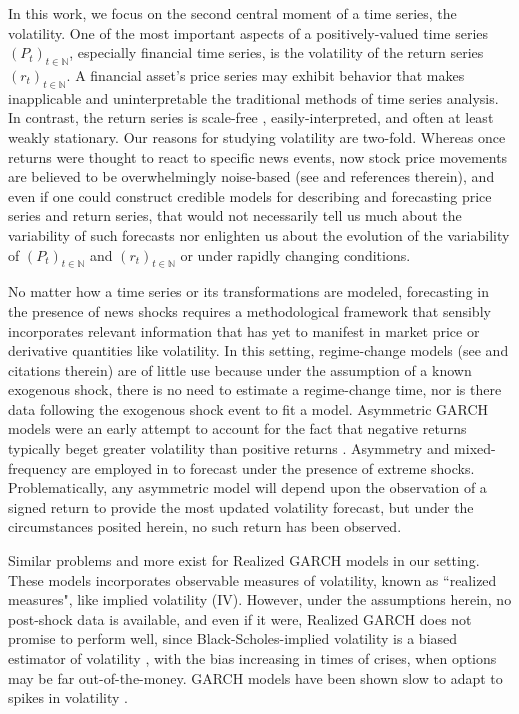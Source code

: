 \documentclass{uiucthesis2021}
\theoremstyle{definition}
\begin{document}
In this work, we focus on the second central moment of a time series, the volatility.  One of the most important aspects of a positively-valued time series $(P_{t})_{t\in\mathbb{N}}$, especially financial time series, is the volatility of the return series $(r_{t})_{t\in\mathbb{N}}$.  A financial asset's price series may exhibit behavior that makes inapplicable and uninterpretable the traditional methods of time series analysis.  In contrast, the return series is scale-free \citep{tsay2005analysis}, easily-interpreted, and often at least weakly stationary.  Our reasons for studying volatility are two-fold.  Whereas once returns were thought to react to specific news events, now stock price movements are believed to be overwhelmingly noise-based (see \citet{boudoukh2019information} and references therein), and even if one could construct credible models for describing and forecasting price series and return series, that would not necessarily tell us much about the variability of such forecasts nor enlighten us about the evolution of the variability of $(P_{t})_{t\in\mathbb{N}}$ and $(r_{t})_{t\in\mathbb{N}}$ or under rapidly changing conditions. 

No matter how a time series or its transformations are modeled, forecasting in the presence of news shocks requires a methodological framework that sensibly incorporates relevant information that has yet to manifest in market price or derivative quantities like volatility.  In this setting, regime-change models (see \citet{bauwens2006regime} and citations therein) are of little use because under the assumption of a known exogenous shock, there is no need to estimate a regime-change time, nor is there data following the exogenous shock event to fit a model.  Asymmetric GARCH models were an early attempt to account for the fact that negative returns typically beget greater volatility than positive returns \citep{hansen2012realized}.  Asymmetry and mixed-frequency are employed in \cite{wang2020forecasting} to forecast under the presence of extreme shocks.  Problematically, any asymmetric model will depend upon the observation of a signed return to provide the most updated volatility forecast, but under the circumstances posited herein, no such return has been observed.

Similar problems and more exist for Realized GARCH models \citep{hansen2012realized} in our setting. These models incorporates observable measures of volatility, known as  ``realized measures", like implied volatility (IV). However, under the assumptions herein, no post-shock data is available, and even if it were, Realized GARCH does not promise to perform well, since Black-Scholes-implied volatility is a biased estimator of volatility \citep{mayhew1995implied, christensen1998relation}, with the bias increasing in times of crises, when options may be far out-of-the-money.  GARCH models have been shown slow to adapt to spikes in volatility \citep{andersen2003modeling}.
\end{document}
